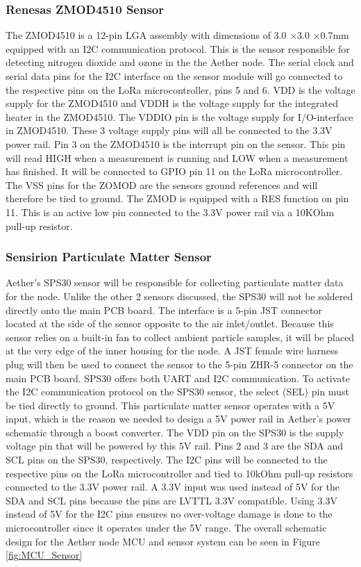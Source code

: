 \subsubsection{Renesas ZMOD4510 Sensor}
The ZMOD4510 is a 12-pin LGA assembly with dimensions of 3.0 ×3.0 ×0.7mm equipped with an I2C communication protocol. This is the sensor responsible for detecting nitrogen dioxide and ozone in the the Aether node. The serial clock and serial data pins for the I2C interface on the sensor module will go connected to the respective pins on the LoRa microcontroller, pins 5 and 6. VDD is the voltage supply for the ZMOD4510 and VDDH is the voltage supply for the integrated heater in the ZMOD4510. The VDDIO pin is the voltage supply for I/O-interface in ZMOD4510. These 3 voltage supply pins will all be connected to the 3.3V power rail. Pin 3 on the ZMOD4510 is the interrupt pin on the sensor. This pin will read HIGH when a measurement is running and LOW when a measurement has finished. It will be connected to GPIO pin 11 on the LoRa microcontroller. The VSS pins for the ZOMOD are the sensors ground references and will therefore be tied to ground. The ZMOD is equipped with a RES function on pin 11. This is an  active low pin connected to the 3.3V power rail via a 10KOhm pull-up resistor. 

\subsubsection{Sensirion Particulate Matter Sensor}
Aether's SPS30 sensor will be responsible for collecting particulate matter data for the node. Unlike the other 2 sensors discussed, the SPS30 will not be soldered directly onto the main PCB board. The interface is a 5-pin JST connector located at the side of the sensor opposite to the air inlet/outlet. Because this sensor relies on a built-in fan to collect ambient particle samples, it will be placed at the very edge of the inner housing for the node. A JST female wire harness plug will then be used to connect the sensor to the 5-pin ZHR-5 connector on the main PCB board. SPS30 offers both UART and I2C communication. To activate the I2C communication protocol on the SPS30 sensor, the select (SEL) pin must be tied directly to ground. This particulate matter sensor operates with a 5V input, which is the reason we needed to design a 5V power rail in Aether's power schematic through a boost converter. The VDD pin on the SPS30 is the supply voltage pin that will be powered by this 5V rail. Pins 2 and 3 are the SDA and SCL pins on the SPS30, respectively. The I2C pins will be connected to the respective pins on the LoRa microcontroller and tied to 10kOhm pull-up resistors connected to the 3.3V power rail. A 3.3V input was used instead of 5V for the SDA and SCL pins because the pins are LVTTL 3.3V compatible. Using 3.3V instead of 5V for the I2C pins ensures no over-voltage damage is done to the microcontroller since it operates under the 5V range. The overall schematic design for the Aether node MCU and sensor system can be seen in Figure \ref{fig:MCU_Sensor}

